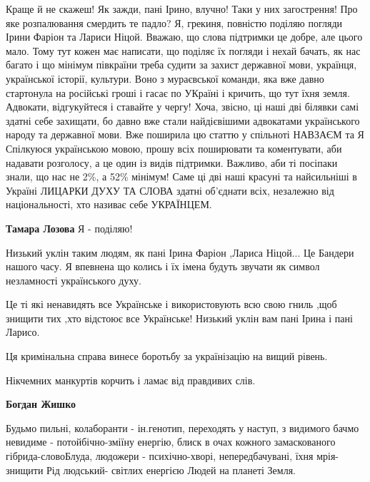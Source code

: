 \begin{itemize}
Краще й не скажеш! Як зажди, пані Ірино, влучно! Таки у них загострення! Про
яке розпалювання смердить те падло? Я, грекиня, повністю поділяю погляди Ірини
Фаріон та Лариси Ніцой. Вважаю, що слова підтримки це добре, але цього мало.
Тому тут кожен має написати, що поділяє їх погляди і нехай бачать, як нас
багато і що мінімум півкраїни треба судити за захист державної мови, українця,
української історії, культури. Воно з мураєвської команди, яка вже давно
стартонула на російські гроші і гасає по УКраїні і кричить, що тут їхня земля.
Адвокати, відгукуйтеся і ставайте у чергу! Хоча, звісно, ці наші дві білявки
самі здатні себе захищати, бо давно вже стали найдієвішими адвокатами
українського народу та державної мови. Вже поширила цю статтю у спільноті
НАВЗАЄМ та Я Спілкуюся українською мовою, прошу всіх поширювати та коментувати,
аби надавати розголосу, а це один із видів підтримки. Важливо, аби ті посіпаки
знали, що нас не 2\%, а 52\% мінімум! Саме ці дві наші красуні та найсильніші в
Україні ЛИЦАРКИ ДУХУ ТА СЛОВА здатні об'єднати всіх, незалежно від
національності, хто називає себе УКРАЇНЦЕМ.

\begin{itemize} %
\textbf{Тамара Лозова} Я - поділяю!
\end{itemize} %


Низький уклін таким людям, як пані Ірина Фаріон ,Лариса Ніцой... Це Бандери
нашого часу. Я впевнена що колись і їх імена будуть звучати як символ
незламності українського духу.


Це ті які ненавидять все Українське і використовують всю свою гниль ,щоб
знищити тих ,хто відстоює все Українське! Низький уклін вам пані Ірина і пані
Ларисо.

Ця кримінальна справа винесе боротьбу за українізацію на вищий рівень.

Нікчемних манкуртів корчить і ламає від правдивих слів.

\textbf{Богдан Жишко} 

Будьмо пильні, колаборанти - ін.генотип, переходять у наступ, з видимого бачмо
невидиме - потойбічно-зміїну енергію, блиск в очах кожного замаскованого
гібрида-словоБлуда, людожери - психічно-хворі, непередбачувані, їхня мрія-
знищити Рід людський- світлих енергією Людей на планеті Земля.



\end{itemize}
